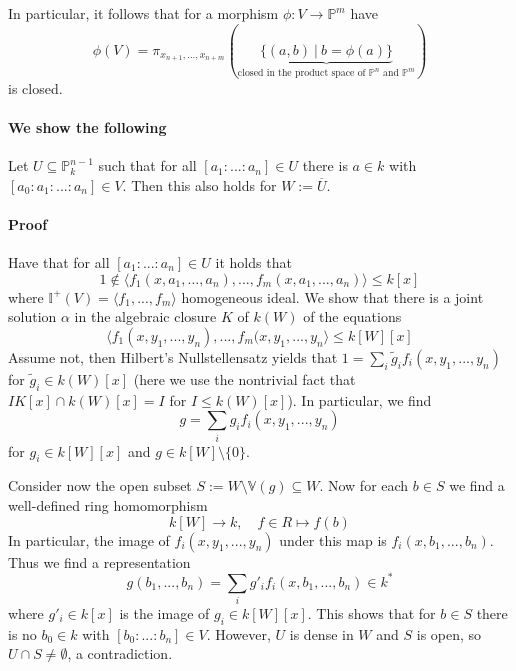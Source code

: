 \documentclass{scrartcl}
\newcommand{\I}{\mathbb{I}}
\newcommand{\V}{\mathbb{V}}
\begin{document}
In particular, it follows that for a morphism $\phi: V \to \mathbb{P}^m$ have \
\begin{equation*}
    \phi(V) = \pi_{x_{n + 1}, ..., x_{n + m}}(\underbrace{\{ (a, b) \ | \ b = \phi(a) \}}_{\text{closed in the product space of $\mathbb{P}^n$ and $\mathbb{P}^m$}})
\end{equation*}
is closed.

\paragraph{We show the following}
Let $U \subseteq \mathbb{P}^{n - 1}_k$ such that for all $[a_1 : ... : a_n] \in U$ there is $a \in k$ with $[a_0 : a_1 : ... : a_n] \in V$.
Then this also holds for $W := \overline{U}$.
\paragraph{Proof} 
Have that for all $[a_1 : ... : a_n] \in U$ it holds that
\begin{equation*}
    1 \notin \langle f_1(x, a_1, ..., a_n), ..., f_m(x, a_1, ..., a_n) \rangle \leq k[x]
\end{equation*}
where $\I^+(V) = \langle f_1, ..., f_m \rangle$ homogeneous ideal. 
We show that there is a joint solution $\alpha$ in the algebraic closure $K$ of $k(W)$ of the equations
\begin{equation*}
    \langle f_1(x, y_1, ..., y_n), ..., f_m(x, y_1, ..., y_n \rangle \leq k[W][x]
\end{equation*}
Assume not, then Hilbert's Nullstellensatz yields that $1 = \sum_i \tilde{g}_i f_i(x, y_1, ..., y_n)$ for $\tilde{g}_i \in k(W)[x]$
(here we use the nontrivial fact that $IK[x] \cap k(W)[x] = I$ for $I \leq k(W)[x]$).
In particular, we find
\begin{equation*}
    g = \sum_i g_i f_i(x, y_1, ..., y_n)
\end{equation*}
for $g_i \in k[W][x]$ and $g \in k[W] \setminus \{0\}$.

Consider now the open subset $S := W \setminus \V(g) \subseteq W$.
Now for each $b \in S$ we find a well-defined ring homomorphism
\begin{equation*}
    k[W] \to k, \quad f \in R \mapsto f(b)
\end{equation*}
In particular, the image of $f_i(x, y_1, ..., y_n)$ under this map is $f_i(x, b_1, ..., b_n)$. 
Thus we find a representation
\begin{equation*}
    g(b_1, ..., b_n) = \sum_i g'_i f_i(x, b_1, ..., b_n) \in k^*
\end{equation*}
where $g'_i \in k[x]$ is the image of $g_i \in k[W][x]$.
This shows that for $b \in S$ there is no $b_0 \in k$ with $[b_0 : ... : b_n] \in V$.
However, $U$ is dense in $W$ and $S$ is open, so $U \cap S \neq \emptyset$, a contradiction.
\end{document}
